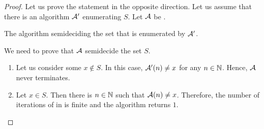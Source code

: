 \begin{proof}
  Let us prove the statement in the opposite direction. Let us assume that
  there is an algorithm $\mathcal{A}'$ enumerating $S$. Let $\mathcal{A}$
  be .
  \begin{algorithm}
      \begin{algorithmic}[1]
              \label{line:while-semideciding-from-enumerating}
              \EndWhile
          \EndFunction
      \end{algorithmic}
      \caption{The algorithm semideciding the set that is enumerated by
        $\mathcal{A}'$.}
      \label{algorithm:semideciding-from-enumerating}
  \end{algorithm}
  We need to prove that $\mathcal{A}$ semidecide the set $S$.
  \begin{enumerate}
    \item Let us consider some $x \notin S$. In this case,
      $\mathcal{A}'(n) \neq x$ for any $n \in {\mathbb{N}}$. Hence, $\mathcal{A}$
      never terminates.
    \item Let $x \in S$. Then there is $n \in {\mathbb{N}}$ such that
      $\mathcal{A}(n) \neq x$.
      Therefore, the number of iterations of
       in
       is finite and the
      algorithm returns $1$.
  \end{enumerate}
\end{proof}

